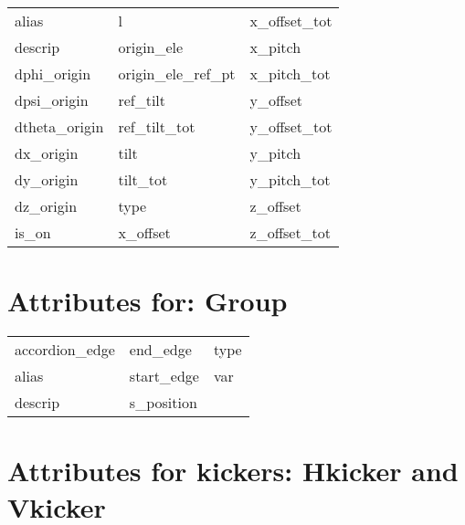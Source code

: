  \begin{tabular}{lll} \toprule
alias                       & l                           & x_offset_tot                \\
descrip                     & origin_ele                  & x_pitch                     \\
dphi_origin                 & origin_ele_ref_pt           & x_pitch_tot                 \\
dpsi_origin                 & ref_tilt                    & y_offset                    \\
dtheta_origin               & ref_tilt_tot                & y_offset_tot                \\
dx_origin                   & tilt                        & y_pitch                     \\
dy_origin                   & tilt_tot                    & y_pitch_tot                 \\
dz_origin                   & type                        & z_offset                    \\
is_on                       & x_offset                    & z_offset_tot                \\
 \bottomrule
 \end{tabular}
 \vfill
 
 \section{Attributes for: Group}
 \label{s:list.group}
 
 \begin{tabular}{lll} \toprule
accordion_edge              & end_edge                    & type                        \\
alias                       & start_edge                  & var                         \\
descrip                     & s_position                  &                             \\
 \bottomrule
 \end{tabular}
 \vfill
 
 \section{Attributes for kickers: Hkicker and Vkicker}
 \label{s:list.hvkicker}
 
